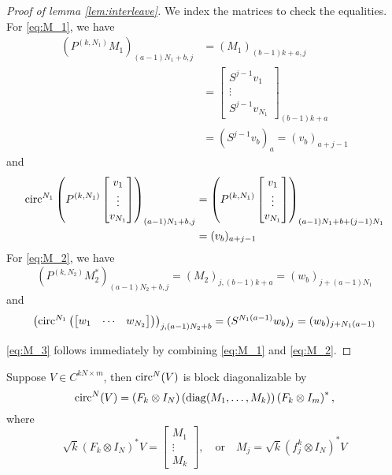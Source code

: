 \begin{proof}[Proof of lemma \ref{lem:interleave}]
  We index the matrices to check the equalities.  For \eqref{eq:M_1}, we have \begin{align*}
    (P^{(k, N_1)} M_1)_{(a-1)N_1 + b, j} &= (M_1)_{(b - 1) k + a, j} \\ &= \begin{bmatrix} S^{j - 1}v_1 \\ \vdots \\ S^{j - 1} v_{N_1} \end{bmatrix}_{(b - 1)k + a} \\ &= (S^{j - 1}v_b)_a = (v_b)_{a + j - 1}
  \end{align*}
  and
  \begin{align*}
    \circop^{N_1}\left(P^{(k, N_1)} \begin{bmatrix} v_1 \\ \vdots \\ v_{N_1} \end{bmatrix}\right)_{(a-1)N_1 + b, j} &= \left(P^{(k, N_1)} \begin{bmatrix} v_1 \\ \vdots \\ v_{N_1} \end{bmatrix}\right)_{(a - 1)N_1 + b + (j-1)N_1} \\
    &= %
    (v_b)_{a + j - 1}
  \end{align*}
  For \eqref{eq:M_2}, we have
 \[(P^{(k, N_2)} M_2^*)_{(a - 1)N_2 + b, j} = (M_2)_{j, (b - 1) k + a} = (w_b)_{j + (a - 1)N_1}\]
  and
  \[\left(\operatorname{circ}^{N_1}\left(\begin{bmatrix} w_1 & \cdots & w_{N_2} \end{bmatrix}\right)\right)_{j, (a - 1)N_2 + b} = (S^{N_1(a - 1)} w_b)_j = (w_b)_{j + N_1(a - 1)}\]

  \eqref{eq:M_3} follows immediately by combining \eqref{eq:M_1} and \eqref{eq:M_2}.
\end{proof}

\begin{lemma}
  Suppose $V \in C^{k N \times m}$, then $\operatorname{circ}^N(V)$ is block diagonalizable by \[\operatorname{circ}^N(V) = \left(F_k \otimes I_N\right) \left(\operatorname{diag}(M_1, \ldots, M_k)\right) \left(F_k \otimes I_m\right)^*,\] where \[\sqrt{k}\left(F_k \otimes I_N\right)^* V = \begin{bmatrix} M_1 \\ \vdots \\ M_k \end{bmatrix}, \quad \text{or} \quad M_j = \sqrt{k} (f_j^k \otimes I_N)^* V\] \label{lem:circ_diag}
\end{lemma}

